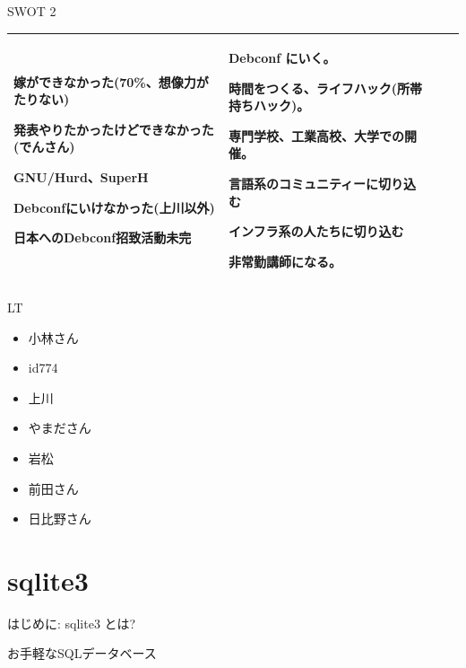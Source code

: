\begin{frame}{SWOT 2}
{\begin{tabular}[t]{|p{1em}|p{16em}|p{12em}|p{12em}|}
嫁ができなかった(70\%、想像力がたりない)

発表やりたかったけどできなかった(でんさん)

GNU/Hurd、SuperH

Debconfにいけなかった(上川以外)

日本へのDebconf招致活動未完

&

Debconf にいく。

時間をつくる、ライフハック(所帯持ちハック)。

専門学校、工業高校、大学での開催。


言語系のコミュニティーに切り込む

インフラ系の人たちに切り込む

非常勤講師になる。

&

\\
\hline
\end{tabular}
}
\end{frame}


\begin{frame}{LT}

 \begin{itemize}
  \item 小林さん
  \item  id774
  \item 上川
  \item やまださん
  \item 岩松
  \item 前田さん
  \item 日比野さん
 \end{itemize}
 
\end{frame}

\section{sqlite3}
\begin{frame}{はじめに: sqlite3 とは?}

 お手軽なSQLデータベース

\end{frame}


